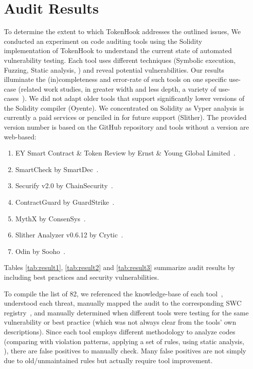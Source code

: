 \section{Audit Results}
To determine the extent to which TokenHook addresses the outlined issues, We conducted an experiment on code auditing tools using the Solidity implementation of TokenHook to understand the current state of automated vulnerability testing. Each tool uses different techniques (\eg Symbolic execution, Fuzzing, Static analysis, \etc) and reveal potential vulnerabilities. Our results illuminate the (in)completeness and error-rate of such tools on one specific use-case (related work studies, in greater width and less depth, a variety of use-cases~\cite{AuditTools}). We did not adapt older tools that support significantly lower versions of the Solidity compiler (\eg Oyente). We concentrated on Solidity as Vyper analysis is currently a paid services or penciled in for future support (\eg Slither). The provided version number is based on the GitHub repository and tools without a version are web-based:
\begin{enumerate}
	\item EY Smart Contract \& Token Review by Ernst \& Young Global Limited~\cite{EYTool}.
	\item SmartCheck by SmartDec~\cite{SMARTCHECK}.
	\item Securify v2.0 by ChainSecurity~\cite{SECURIFYGIT,SECURIFY}.
	\item ContractGuard by GuardStrike~\cite{ContractGuard}.
	\item MythX by ConsenSys~\cite{MythX}.
	\item Slither Analyzer v0.6.12 by Crytic~\cite{SlitherDoc}.
	\item Odin by Sooho~\cite{Odin}.
\end{enumerate}

Tables \ref{tab:result1}, \ref{tab:result2} and \ref{tab:result3} summarize audit results by including best practices and security vulnerabilities. 


To compile the list of 82, we referenced the knowledge-base of each tool~\cite{SECURIFYGIT,SMARTCHECK,MythX,ContractGuard,SlitherDoc}, understood each threat, manually mapped the audit to the corresponding SWC registry~\cite{SWC}, and manually determined when different tools were testing for the same vulnerability or best practice (which was not always clear from the tools' own descriptions). Since each tool employs different methodology to analyze codes (\eg comparing with violation patterns, applying a set of rules, using static analysis, \etc), there are false positives to manually check. Many false positives are not simply due to old/unmaintained rules but actually require tool improvement.

